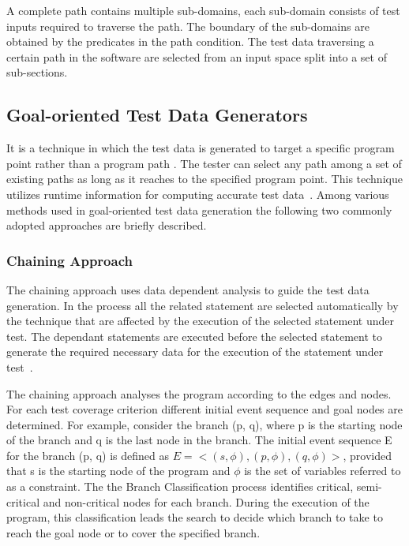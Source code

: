 A complete path contains multiple sub-domains, each sub-domain consists of test inputs required to traverse the path. The boundary of the sub-domains are obtained by the predicates in the path condition. The test data traversing a certain path in the software are selected from an input space split into a set of sub-sections. 



\subsection{Goal-oriented Test Data Generators}
\label{sec:goaloriented_2}
It is a technique in which the test data is generated to target a specific program point rather than a program path \cite{chungautomated}. The tester can select any path among a set of existing paths as long as it reaches to the specified program point. This technique utilizes runtime information for computing accurate test data~\cite{ferguson1996chaining}. Among various methods used in goal-oriented test data generation the following two commonly adopted approaches are briefly described.

\subsubsection{Chaining Approach}
The chaining approach uses data dependent analysis to guide the test data generation. In the process all the related statement are selected automatically by the technique that are affected by the execution of the selected statement under test. The dependant statements are executed before the selected statement to generate the required necessary data for the execution of the statement under test~\cite{ferguson1996chaining}.

The chaining approach analyses the program according to the edges and nodes. For each test coverage criterion different initial event sequence and goal nodes are determined. For example, consider  the branch (p, q), where p is  the starting node of the branch and q is the last node in the branch. The initial event sequence E for the branch (p, q) is defined as $E =< (s,\phi), (p,\phi),(q,\phi) >$, provided that s is the starting node of the program and $\phi$ is the set of variables referred to as a constraint. The the Branch Classification process identifies critical, semi-critical and non-critical nodes for each branch. During the execution of the program, this classification leads the search to decide which branch to take to reach the goal node or to cover the specified branch.  


